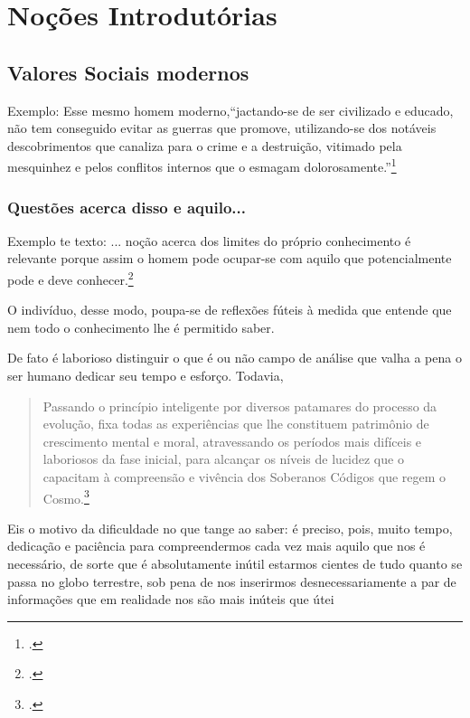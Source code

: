 \part{Noções Introdutórias}




\chapter{Valores Sociais modernos}




Exemplo: Esse mesmo homem moderno,``jactando-se de ser civilizado e educado, não tem conseguido evitar as guerras que promove, utilizando-se dos notáveis descobrimentos que canaliza para o crime e a destruição, vitimado pela mesquinhez e pelos conflitos internos que o esmagam dolorosamente.''\footcite[p. 15]{embuscadaverdade}

\lipsum[1-5]



\section{Questões acerca disso e aquilo...}

Exemplo te texto: ... noção acerca dos limites do próprio conhecimento é relevante porque assim o homem pode ocupar-se com aquilo que potencialmente pode e deve conhecer.\footcite[p. 30]{locke1999ensaio}

O indivíduo, desse modo, poupa-se de reflexões fúteis à medida que entende que nem todo o conhecimento lhe é permitido saber.

De fato é laborioso distinguir o que é ou não campo de análise que valha a pena o ser humano dedicar seu tempo e esforço. Todavia,

\begin{quote}
	Passando o princípio inteligente por diversos patamares do processo
	da evolução, fixa todas as experiências que lhe constituem patrimônio
	de crescimento mental e moral, atravessando os períodos mais difíceis
	e laboriosos da fase inicial, para alcançar os níveis de lucidez que
	o capacitam à compreensão e vivência dos Soberanos Códigos que
	regem o Cosmo.\footcite[p.22]{JoannaDeAngelis2013Vida}
\end{quote}

Eis o motivo da dificuldade no que tange ao saber: é preciso, pois, muito tempo, dedicação e paciência para compreendermos cada vez mais aquilo que nos é necessário, de sorte que é absolutamente inútil estarmos cientes de tudo quanto se passa no globo terrestre, sob pena de nos inserirmos desnecessariamente a par de informações que em realidade nos são mais inúteis que útei

